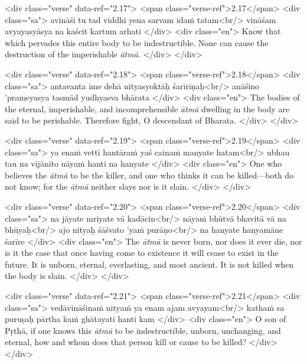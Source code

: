 \begin{html}
<div class="verse" data-ref="2.17">
  <span class="verse-ref">2.17</span>
  <div class="sa">
    avināśi tu tad viddhi yena sarvam idaṁ tatam<br/>
    vināśam avyayasyāsya na kaścit kartum arhati
  </div>
  <div class="en">
    Know that which pervades this entire body to be indestructible. None can cause the destruction of the imperishable \textit{ātmā}.
  </div>
</div>
\end{html}



\begin{html}
<div class="verse" data-ref="2.18">
  <span class="verse-ref">2.18</span>
  <div class="sa">
    antavanta ime dehā nityasyoktāḥ śarīriṇaḥ<br/>
    anāśino ’prameyasya tasmād yudhyasva bhārata
  </div>
  <div class="en">
    The bodies of the eternal, imperishable, and incomprehensible \textit{ātmā} dwelling in the body are said to be perishable. Therefore fight, O descendant of Bharata.
  </div>
</div>
\end{html}



\begin{html}
<div class="verse" data-ref="2.19">
  <span class="verse-ref">2.19</span>
  <div class="sa">
    ya enaṁ vetti hantāraṁ yaś cainaṁ manyate hatam<br/>
    ubhau tau na vijānīto nāyaṁ hanti na hanyate
  </div>
  <div class="en">
    One who believes the \textit{ātmā} to be the killer, and one who thinks it can be killed---both do not know; for the \textit{ātmā} neither slays nor is it slain.
  </div>
</div>
\end{html}



\begin{html}
<div class="verse" data-ref="2.20">
  <span class="verse-ref">2.20</span>
  <div class="sa">
    na jāyate mriyate vā kadācin<br/>
    nāyaṁ bhūtvā bhavitā vā na bhūyaḥ<br/>
    ajo nityaḥ śāśvato ’yaṁ purāṇo<br/>
    na hanyate hanyamāne śarīre
  </div>
  <div class="en">
    The \textit{ātmā} is never born, nor does it ever die, nor is it the case that once having come to existence it will cease to exist in the future. It is unborn, eternal, everlasting, and most ancient. It is not killed when the body is slain.
  </div>
</div>
\end{html}



\begin{html}
<div class="verse" data-ref="2.21">
  <span class="verse-ref">2.21</span>
  <div class="sa">
    vedāvināśinaṁ nityaṁ ya enam ajam avyayam<br/>
    kathaṁ sa puruṣaḥ pārtha kaṁ ghātayati hanti kam
  </div>
  <div class="en">
    O son of Pṛthā, if one knows this \textit{ātmā} to be indestructible, unborn, unchanging, and eternal, how and whom does that person kill or cause to be killed?
  </div>
</div>
\end{html}



